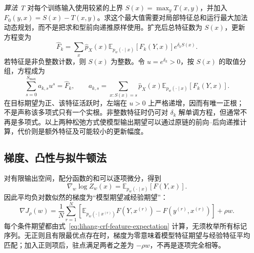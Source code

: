 \emph{算法 T} 对每个训练输入使用较紧的上界 $S(x)=\max_yT(x,y)$，并加入 $F_0(y,x)=S(x)-T(x,y)$。求这个最大值需要对局部特征总和运行最大加法动态规划，而不是把求和型前向递推原样使用。扩充后总特征数为 $S(x)$，更新方程变为
\begin{equation}
\label{eq:lihang-crf-iis-T}
  \widehat F_k
  =\sum_x\widehat p_X(x)
     \mathbb E_{p_w(\cdot\mid x)}[F_k(Y,x)]e^{\delta_kS(x)}.
\end{equation}
若特征是非负整数计数，则 $S(x)$ 为整数。令 $u=e^{\delta_k}>0$，按 $S(x)$ 的取值分组，方程成为
\[
  \sum_{s=0}^{S_{\max}}a_{k,s}u^s=\widehat F_k,\qquad
  a_{k,s}=\sum_{x:S(x)=s}\widehat p_X(x)
                   \mathbb E_{p_w(\cdot\mid x)}[F_k(Y,x)].
\]
在目标期望为正、该特征活跃时，左端在 $u>0$ 上严格递增，因而有唯一正根；不是声称该多项式只有一个实根。非整数特征时仍可对 $\delta_k$ 解单调方程，但通常不再是多项式。以上两种松弛方式使模型输出期望可以通过原链的前向--后向递推计算，代价则是额外特征及可能较小的更新幅度。

\subsection{梯度、凸性与拟牛顿法}
\label{subsec:lihang-crf-gradient-bfgs}

对有限输出空间，配分函数的和可以逐项微分，得到
\begin{equation}
\label{eq:lihang-crf-logZ-gradient}
  \nabla_w\log Z_w(x)=\mathbb E_{p_w(\cdot\mid x)}[F(Y,x)].
\end{equation}
因此平均负对数似然的梯度为“模型期望减经验期望”：
\begin{equation}
\label{eq:lihang-crf-gradient}
  \nabla J_\rho(w)=\frac1N\sum_{r=1}^N
    \left[\mathbb E_{p_w(\cdot\mid x^{(r)})}F(Y,x^{(r)})
           -F(y^{(r)},x^{(r)})\right]+\rho w.
\end{equation}
每个条件期望都由式~\eqref{eq:lihang-crf-feature-expectation} 计算，无须枚举所有标记序列。无正则且有限最优点存在时，梯度为零意味着模型特征期望与经验特征平均匹配；加入正则项后，驻点满足两者之差为 $-\rho w$，不再是逐项完全相等。


